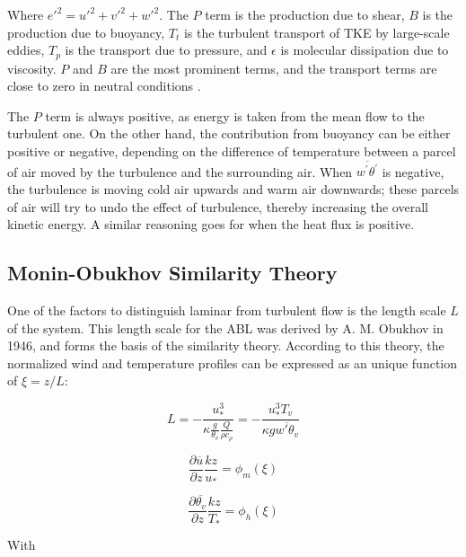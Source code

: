 \documentclass[a4paper]{book}
\begin{document}
Where ${e'}^2={u'}^2+{v'}^2+{w'}^2$. The $P$ term is the production due to shear, $B$ is the production due to buoyancy, $T_t$ is the turbulent transport of TKE by large-scale eddies, $T_p$ is the transport due to pressure, and $\epsilon$ is molecular dissipation due to viscosity. $P$ and $B$ are the most prominent terms, and the transport terms are close to zero in neutral conditions \citep{basicatm}.

The $P$ term is always positive, as energy is taken from the mean flow to the turbulent one. On the other hand, the contribution from buoyancy can be either positive or negative, depending on the difference of temperature between a parcel of air moved by the turbulence and the surrounding air. When $\overline{w^\prime\theta^\prime}$ is negative, the turbulence is moving cold air upwards and warm air downwards; these parcels of air will try to undo the effect of turbulence, thereby increasing the overall kinetic energy. A similar reasoning goes for when the heat flux is positive.

\subsection{Monin-Obukhov Similarity Theory}
\label{sec:most}
One of the factors to distinguish laminar from turbulent flow is the length scale $L$ of the system. This length scale for the ABL was derived by A. M. Obukhov in 1946, and forms the basis of the similarity theory. According to this theory, the normalized wind and temperature profiles can be expressed as an unique function of $\xi=z/L$:

\begin{equation}
\label{eq:most_l}
L=-\frac{u_*^3}{\kappa\frac{g}{\theta_v}\frac{Q}{\rho c_\rho}}
=-\frac{u_*^3 T_v}{\kappa g \overline{w'\theta_v}}
\end{equation}

\begin{equation}
\label{eq:phi_m}
\frac{\partial\overline{u}}{\partial z}\frac{kz}{u_*}=\phi_m(\xi)
\end{equation}

\begin{equation}
\label{eq:phi_h}
\frac{\partial\overline{\theta_v}}{\partial z}\frac{kz}{T_*}=\phi_h(\xi)
\end{equation}

With
\end{document}
